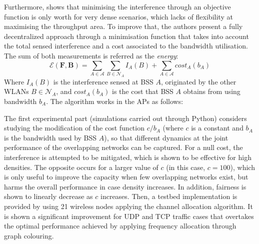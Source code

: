 \documentclass[12pt, a4paper,twoside]{tesi_upf}
\begin{document}
			Furthermore, \cite{herzen2013distributed} shows that minimising the interference through an objective function is only worth for very dense scenarios, which lacks of flexibility at maximising the throughput area. To improve that, the authors present a fully decentralized approach through a minimisation function that takes into account the total sensed interference and a cost associated to the bandwidth utilisation. The sum of both measurements is referred as the \textit{energy}:
			\begin{equation}
			\mathcal{E} (\textbf{F},\textbf{B}) = \sum_{A \in \mathcal{A}} \sum_{B \in \mathcal{N}_A} I_A (B) + \sum_{A \in \mathcal{A}} cost_A (b_A)
			\end{equation}
			Where $I_A (B)$ is the interference sensed at BSS $A$, originated by the other WLANs $B \in \mathcal{N}_A$, and $cost_A (b_A)$ is the cost that BSS $A$ obtains from using bandwidth $b_A$. The algorithm works in the APs as follows:
			\begin{figure}[h!]
				\centering
				\label{fig:saw_alg}
			\end{figure}	
			The first experimental part (simulations carried out through Python) considers studying the modification of the cost function $c/b_A$ (where $c$ is a constant and $b_A$ is the bandwidth used by BSS $A$), so that different dynamics at the joint performance of the overlapping networks can be captured. For a null cost, the interference is attempted to be mitigated, which is shown to be effective for high densities. The opposite occurs for a larger value of $c$ (in this case, $c=100$), which is only useful to improve the capacity when few overlapping networks exist, but harms the overall performance in case density increases. In addition, fairness is shown to linearly decrease as $c$ increases. Then, a testbed implementation is provided by using 21 wireless nodes applying the channel allocation algorithm. It is shown a significant improvement for UDP and TCP traffic cases that overtakes the optimal performance achieved by applying frequency allocation through graph colouring.
								
\end{document}
